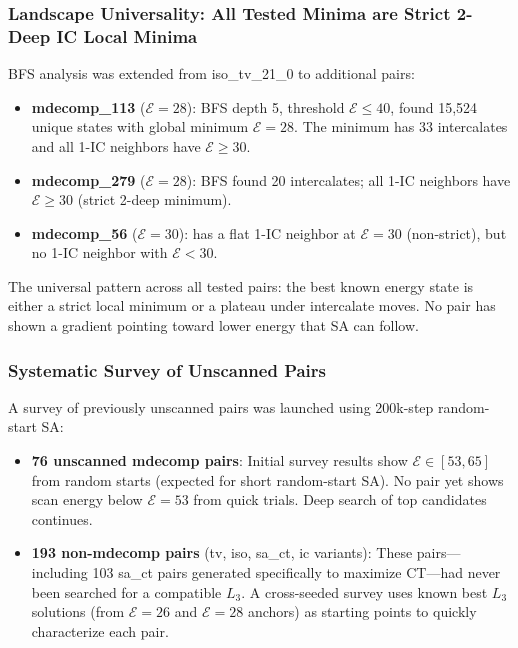 \documentclass[11pt,a4paper]{article}
\theoremstyle{remark}
\newcommand{\E}{\mathcal{E}}
\begin{document}
\subsubsection{Landscape Universality: All Tested Minima are Strict 2-Deep IC Local Minima}

BFS analysis was extended from iso\_tv\_21\_0 to additional pairs:

\begin{itemize}[noitemsep]
  \item \textbf{mdecomp\_113} ($\E=28$): BFS depth 5, threshold $\E \leq 40$, found
    15,524 unique states with global minimum $\E=28$. The minimum has 33 intercalates
    and all 1-IC neighbors have $\E \geq 30$.
  \item \textbf{mdecomp\_279} ($\E=28$): BFS found 20 intercalates; all 1-IC neighbors
    have $\E \geq 30$ (strict 2-deep minimum).
  \item \textbf{mdecomp\_56} ($\E=30$): has a flat 1-IC neighbor at $\E=30$ (non-strict),
    but no 1-IC neighbor with $\E < 30$.
\end{itemize}

The universal pattern across all tested pairs: the best known energy state is either a
strict local minimum or a plateau under intercalate moves. No pair has shown a gradient
pointing toward lower energy that SA can follow.

\subsubsection{Systematic Survey of Unscanned Pairs}

A survey of previously unscanned pairs was launched using 200k-step random-start SA:
\begin{itemize}[noitemsep]
  \item \textbf{76 unscanned mdecomp pairs}: Initial survey results show $\E \in [53, 65]$
    from random starts (expected for short random-start SA). No pair yet shows scan
    energy below $\E=53$ from quick trials. Deep search of top candidates continues.
  \item \textbf{193 non-mdecomp pairs} (tv, iso, sa\_ct, ic variants): These pairs---
    including 103 sa\_ct pairs generated specifically to maximize CT---had never been
    searched for a compatible $L_3$. A cross-seeded survey uses known best $L_3$ solutions
    (from $\E=26$ and $\E=28$ anchors) as starting points to quickly characterize each pair.
\end{itemize}
\end{document}
